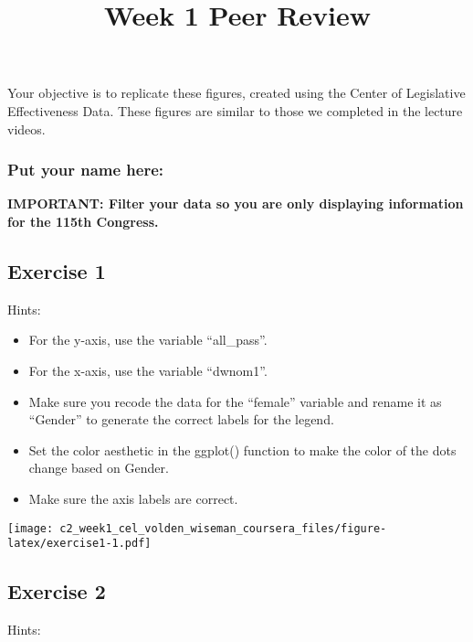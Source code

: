 \documentclass[
]{article}
\title{Week 1 Peer Review}
\author{}
\date{\vspace{-2.5em}}
\begin{document}
\maketitle

Your objective is to replicate these figures, created using the Center
of Legislative Effectiveness Data. These figures are similar to those we
completed in the lecture videos.

\hypertarget{put-your-name-here}{%
\subsubsection{Put your name here:}\label{put-your-name-here}}

\textbf{IMPORTANT: Filter your data so you are only displaying
information for the 115th Congress.}

\hypertarget{exercise-1}{%
\subsection{Exercise 1}\label{exercise-1}}

Hints:

\begin{itemize}
\item
  For the y-axis, use the variable ``all\_pass''.
\item
  For the x-axis, use the variable ``dwnom1''.
\item
  Make sure you recode the data for the ``female'' variable and rename
  it as ``Gender'' to generate the correct labels for the legend.
\item
  Set the color aesthetic in the ggplot() function to make the color of
  the dots change based on Gender.
\item
  Make sure the axis labels are correct.
\end{itemize}

\texttt{[image: c2\_week1\_cel\_volden\_wiseman\_coursera\_files/figure-latex/exercise1-1.pdf]}

\hypertarget{exercise-2}{%
\subsection{Exercise 2}\label{exercise-2}}

Hints:
\end{document}
